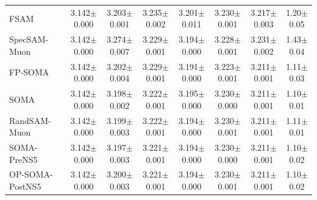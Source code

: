 \begin{table}[t]
{\begin{tabular}{lccccccc}
    FSAM & 3.142{\scriptsize$\pm$0.000} & 3.203{\scriptsize$\pm$0.001} & 3.235{\scriptsize$\pm$0.002} & 3.201{\scriptsize$\pm$0.011} & 3.230{\scriptsize$\pm$0.001} & 3.217{\scriptsize$\pm$0.003} & 1.20{\scriptsize$\pm$0.05} \\
    SpecSAM-Muon & 3.142{\scriptsize$\pm$0.000} & 3.274{\scriptsize$\pm$0.007} & 3.229{\scriptsize$\pm$0.001} & 3.194{\scriptsize$\pm$0.000} & 3.228{\scriptsize$\pm$0.001} & 3.231{\scriptsize$\pm$0.002} & 1.43{\scriptsize$\pm$0.04} \\
    FP-SOMA & 3.142{\scriptsize$\pm$0.000} & 3.202{\scriptsize$\pm$0.004} & 3.229{\scriptsize$\pm$0.001} & 3.191{\scriptsize$\pm$0.000} & 3.223{\scriptsize$\pm$0.001} & 3.211{\scriptsize$\pm$0.001} & 1.11{\scriptsize$\pm$0.03} \\
    SOMA & 3.142{\scriptsize$\pm$0.000} & 3.198{\scriptsize$\pm$0.002} & 3.222{\scriptsize$\pm$0.001} & 3.195{\scriptsize$\pm$0.000} & 3.230{\scriptsize$\pm$0.000} & 3.211{\scriptsize$\pm$0.001} & 1.10{\scriptsize$\pm$0.01} \\
    RandSAM-Muon & 3.142{\scriptsize$\pm$0.000} & 3.199{\scriptsize$\pm$0.003} & 3.222{\scriptsize$\pm$0.001} & 3.194{\scriptsize$\pm$0.000} & 3.230{\scriptsize$\pm$0.001} & 3.211{\scriptsize$\pm$0.001} & 1.11{\scriptsize$\pm$0.01} \\
    SOMA-PreNS5 & 3.142{\scriptsize$\pm$0.000} & 3.197{\scriptsize$\pm$0.003} & 3.221{\scriptsize$\pm$0.001} & 3.194{\scriptsize$\pm$0.000} & 3.230{\scriptsize$\pm$0.000} & 3.211{\scriptsize$\pm$0.001} & 1.10{\scriptsize$\pm$0.02} \\
    OP-SOMA-PostNS5 & 3.142{\scriptsize$\pm$0.000} & 3.200{\scriptsize$\pm$0.003} & 3.221{\scriptsize$\pm$0.001} & 3.194{\scriptsize$\pm$0.000} & 3.230{\scriptsize$\pm$0.001} & 3.211{\scriptsize$\pm$0.001} & 1.10{\scriptsize$\pm$0.02} \\
    \bottomrule
  \end{tabular}}
\end{table}
